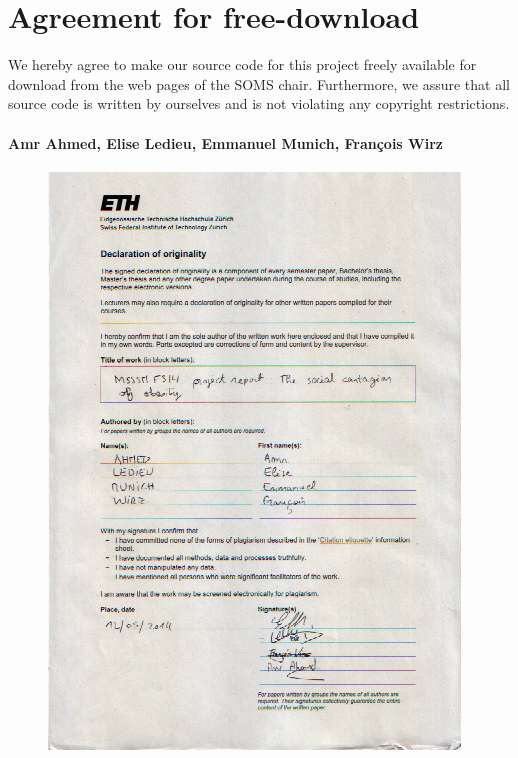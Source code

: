 \documentclass[11pt]{article}
\author{Amr Ahmed, Elise Ledieu, Emmanuel Munich, Fran\c{c}ois Wirz}
\begin{document}

\newpage


\newpage
\section*{Agreement for free-download}
\bigskip


\bigskip


\large We hereby agree to make our source code for this project freely available for download from the web pages of the SOMS chair. Furthermore, we assure that all source code is written by ourselves and is not violating any copyright restrictions.

\begin{center}

\bigskip


\bigskip


\paragraph{Amr Ahmed, Elise Ledieu, Emmanuel Munich, Fran\c{c}ois Wirz}

\end{center}
\newpage



\newpage


\begin{figure}[p]
   \includegraphics{chartre.png}
\end{figure}
\end{document}

